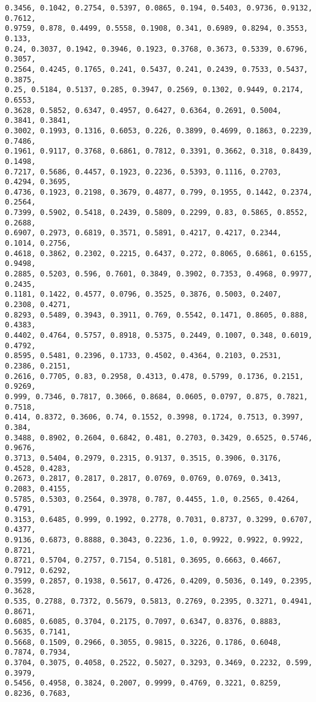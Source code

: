 \documentclass[11pt]{article}
\begin{document}
\begin{Verbatim}[commandchars=\\\{\}]
0.3456, 0.1042, 0.2754, 0.5397, 0.0865, 0.194, 0.5403, 0.9736, 0.9132, 0.7612,
0.9759, 0.878, 0.4499, 0.5558, 0.1908, 0.341, 0.6989, 0.8294, 0.3553, 0.133,
0.24, 0.3037, 0.1942, 0.3946, 0.1923, 0.3768, 0.3673, 0.5339, 0.6796, 0.3057,
0.2564, 0.4245, 0.1765, 0.241, 0.5437, 0.241, 0.2439, 0.7533, 0.5437, 0.3875,
0.25, 0.5184, 0.5137, 0.285, 0.3947, 0.2569, 0.1302, 0.9449, 0.2174, 0.6553,
0.3628, 0.5852, 0.6347, 0.4957, 0.6427, 0.6364, 0.2691, 0.5004, 0.3841, 0.3841,
0.3002, 0.1993, 0.1316, 0.6053, 0.226, 0.3899, 0.4699, 0.1863, 0.2239, 0.7486,
0.1961, 0.9117, 0.3768, 0.6861, 0.7812, 0.3391, 0.3662, 0.318, 0.8439, 0.1498,
0.7217, 0.5686, 0.4457, 0.1923, 0.2236, 0.5393, 0.1116, 0.2703, 0.4294, 0.3695,
0.4736, 0.1923, 0.2198, 0.3679, 0.4877, 0.799, 0.1955, 0.1442, 0.2374, 0.2564,
0.7399, 0.5902, 0.5418, 0.2439, 0.5809, 0.2299, 0.83, 0.5865, 0.8552, 0.2688,
0.6907, 0.2973, 0.6819, 0.3571, 0.5891, 0.4217, 0.4217, 0.2344, 0.1014, 0.2756,
0.4618, 0.3862, 0.2302, 0.2215, 0.6437, 0.272, 0.8065, 0.6861, 0.6155, 0.9498,
0.2885, 0.5203, 0.596, 0.7601, 0.3849, 0.3902, 0.7353, 0.4968, 0.9977, 0.2435,
0.1181, 0.1422, 0.4577, 0.0796, 0.3525, 0.3876, 0.5003, 0.2407, 0.2308, 0.4271,
0.8293, 0.5489, 0.3943, 0.3911, 0.769, 0.5542, 0.1471, 0.8605, 0.888, 0.4383,
0.4402, 0.4764, 0.5757, 0.8918, 0.5375, 0.2449, 0.1007, 0.348, 0.6019, 0.4792,
0.8595, 0.5481, 0.2396, 0.1733, 0.4502, 0.4364, 0.2103, 0.2531, 0.2386, 0.2151,
0.2616, 0.7705, 0.83, 0.2958, 0.4313, 0.478, 0.5799, 0.1736, 0.2151, 0.9269,
0.999, 0.7346, 0.7817, 0.3066, 0.8684, 0.0605, 0.0797, 0.875, 0.7821, 0.7518,
0.414, 0.8372, 0.3606, 0.74, 0.1552, 0.3998, 0.1724, 0.7513, 0.3997, 0.384,
0.3488, 0.8902, 0.2604, 0.6842, 0.481, 0.2703, 0.3429, 0.6525, 0.5746, 0.9676,
0.3713, 0.5404, 0.2979, 0.2315, 0.9137, 0.3515, 0.3906, 0.3176, 0.4528, 0.4283,
0.2673, 0.2817, 0.2817, 0.2817, 0.0769, 0.0769, 0.0769, 0.3413, 0.2083, 0.4155,
0.5785, 0.5303, 0.2564, 0.3978, 0.787, 0.4455, 1.0, 0.2565, 0.4264, 0.4791,
0.3153, 0.6485, 0.999, 0.1992, 0.2778, 0.7031, 0.8737, 0.3299, 0.6707, 0.4377,
0.9136, 0.6873, 0.8888, 0.3043, 0.2236, 1.0, 0.9922, 0.9922, 0.9922, 0.8721,
0.8721, 0.5704, 0.2757, 0.7154, 0.5181, 0.3695, 0.6663, 0.4667, 0.7912, 0.6292,
0.3599, 0.2857, 0.1938, 0.5617, 0.4726, 0.4209, 0.5036, 0.149, 0.2395, 0.3628,
0.535, 0.2788, 0.7372, 0.5679, 0.5813, 0.2769, 0.2395, 0.3271, 0.4941, 0.8671,
0.6085, 0.6085, 0.3704, 0.2175, 0.7097, 0.6347, 0.8376, 0.8883, 0.5635, 0.7141,
0.5668, 0.1509, 0.2966, 0.3055, 0.9815, 0.3226, 0.1786, 0.6048, 0.7874, 0.7934,
0.3704, 0.3075, 0.4058, 0.2522, 0.5027, 0.3293, 0.3469, 0.2232, 0.599, 0.3979,
0.5456, 0.4958, 0.3824, 0.2007, 0.9999, 0.4769, 0.3221, 0.8259, 0.8236, 0.7683,

\end{Verbatim}
\end{document}
